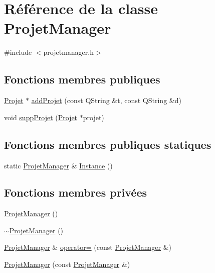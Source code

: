 \hypertarget{class_projet_manager}{}\section{Référence de la classe Projet\+Manager}
\label{class_projet_manager}


{\ttfamily \#include $<$projetmanager.\+h$>$}

\subsection*{Fonctions membres publiques}
\begin{DoxyCompactItemize}
\item 
\hyperlink{class_projet}{Projet} $\ast$ \hyperlink{class_projet_manager_a1c547839afb77faaa3eb2f37e0c869a7}{add\+Projet} (const Q\+String \&t, const Q\+String \&d)
\item 
void \hyperlink{class_projet_manager_a7c76e23d621d3e904e3e2a1bdc4c176c}{supp\+Projet} (\hyperlink{class_projet}{Projet} $\ast$projet)
\end{DoxyCompactItemize}
\subsection*{Fonctions membres publiques statiques}
\begin{DoxyCompactItemize}
\item 
static \hyperlink{class_projet_manager}{Projet\+Manager} \& \hyperlink{class_projet_manager_ad61417127cad478ea812d560b18b975d}{Instance} ()
\end{DoxyCompactItemize}
\subsection*{Fonctions membres privées}
\begin{DoxyCompactItemize}
\item 
\hyperlink{class_projet_manager_a98d8ba59bd9bc6eec2ec5285102ac9a1}{Projet\+Manager} ()
\item 
\hyperlink{class_projet_manager_af5a44cde2f8d92f05bb7e52a18aa883a}{$\sim$\+Projet\+Manager} ()
\item 
\hyperlink{class_projet_manager}{Projet\+Manager} \& \hyperlink{class_projet_manager_a25b560fb4e617952ad093bbe74315aaa}{operator=} (const \hyperlink{class_projet_manager}{Projet\+Manager} \&)
\item 
\hyperlink{class_projet_manager_abfdc065f2c1819e13c8adc1562536f35}{Projet\+Manager} (const \hyperlink{class_projet_manager}{Projet\+Manager} \&)
\end{DoxyCompactItemize}
